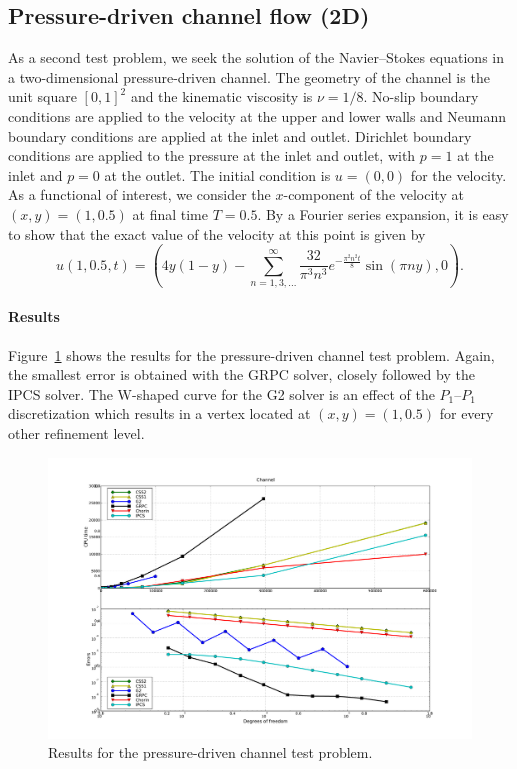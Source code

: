\subsection{Pressure-driven channel flow (2D)}

As a second test problem, we seek the solution of the Navier--Stokes
equations in a two-dimensional pressure-driven channel. The geometry
of the channel is the unit square $[0, 1]^2$ and the kinematic
viscosity is $\nu = 1/8$. No-slip boundary conditions are applied to
the velocity at the upper and lower walls and Neumann boundary
conditions are applied at the inlet and outlet. Dirichlet boundary
conditions are applied to the pressure at the inlet and outlet, with
$p = 1$ at the inlet and $p = 0$ at the outlet. The initial condition
is $u = (0, 0)$ for the velocity. As a functional of interest, we
consider the $x$-component of the velocity at $(x, y) = (1, 0.5)$ at
final time $T = 0.5$. By a Fourier series expansion, it is easy to
show that the exact value of the velocity at this point is given by
\begin{equation*} \label{eq:exact_channel}
  u(1, 0.5, t) = (4y(1-y) - \sum_{n=1,3,...}^\infty \frac{32}{\pi^3 n^3}
  e^{-\frac{\pi^2 n^2 t}{8}} \sin (\pi n y), 0).
\end{equation*}

\paragraph{Results}

Figure~\ref{fig:channel_results} shows the results for the
pressure-driven channel test problem. Again, the smallest error is
obtained with the GRPC solver, closely followed by the IPCS solver.
The W-shaped curve for the G2 solver is an effect of the $P_1$--$P_1$
discretization which results in a vertex located at $(x, y) = (1,
0.5)$ for every other refinement level.

\begin{figure}
  \begin{center}
    \includegraphics[width=14cm]{chapters/kvs-1/pdf/new_channel_res.pdf}
    \caption{Results for the pressure-driven channel test problem.}
    \label{fig:channel_results}
  \end{center}
\end{figure}

